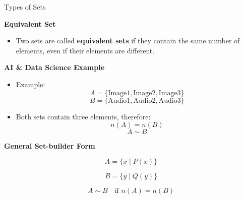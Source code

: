 \documentclass{beamer}
\begin{document}
\begin{frame}{Types of Sets}

\textbf{Equivalent Set}

\begin{itemize}
    \item Two sets are called \textbf{equivalent sets} if they contain the same number of elements, even if their elements are different.
\end{itemize}

\vspace{0.3cm}

\textbf{AI \& Data Science Example}

\begin{itemize}
    \item Example:
    \[
    A=\{\text{Image1},\text{Image2},\text{Image3}\}
    \]
    \[
    B=\{\text{Audio1},\text{Audio2},\text{Audio3}\}
    \]
    \item Both sets contain three elements, therefore:
    \[
    n(A)=n(B)
    \]
    \[
    A\sim B
    \]
\end{itemize}

\vspace{0.3cm}

\textbf{General Set-builder Form}

\[
A=\{x \mid P(x)\}
\]

\[
B=\{y \mid Q(y)\}
\]

\[
A\sim B \quad \text{if } n(A)=n(B)
\]

\end{frame}
\end{document}
